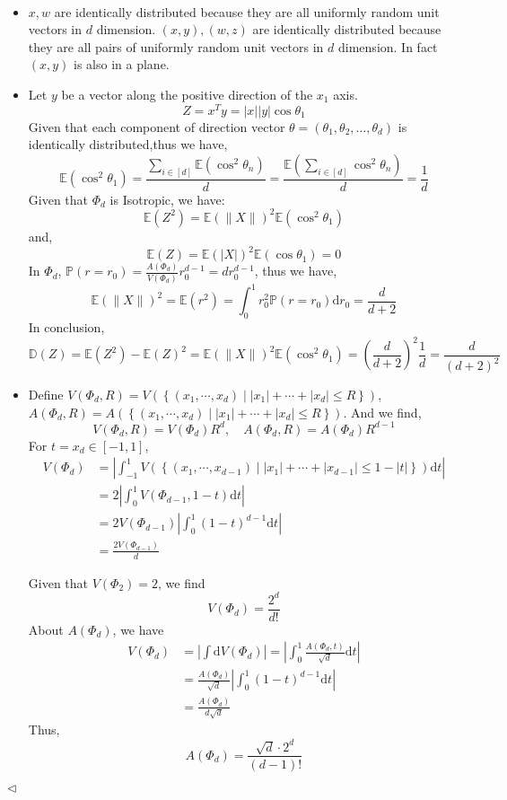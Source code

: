 \documentclass[11pt]{article}
\newenvironment{answer}[1][Answer]{\begin{trivlist}
\item[\hskip \labelsep {\bfseries #1.}\hskip \labelsep]}{\hfill$\lhd$\end{trivlist}}
\begin{document}
\begin{answer} ~
\begin{itemize}
    \item [(1)] 
$x,w$ are identically distributed because they are all uniformly random unit vectors in $d$ dimension.
$(x,y), (w,z)$ are identically distributed because they are all pairs of uniformly random unit vectors in $d$ dimension. In fact $(x,y)$ is also in a plane.
    \item [(2)] 
Let $y$ be a vector along the positive direction of the $x_1$ axis.
$$Z=x^Ty=|x||y|\cos\theta_1$$
Given that each component of direction vector $\theta=(\theta_1,\theta_2,\dots,\theta_d)$ is identically distributed,thus we have,
$$\mathbb E(\cos^2 \theta_1)=\frac{\sum_{i\in [d]}\mathbb E(\cos^2\theta_n)}{d}=\frac{\mathbb E(\sum_{i\in [d]} \cos^2\theta_n)}{d}=\frac{1}{d}$$
Given that $\Phi_d$ is Isotropic, we have:
$$\mathbb E(Z^2)=\mathbb E(\|X\|)^2\mathbb E(\cos^2\theta_1)$$
and,
$$\mathbb E(Z)=\mathbb E(|X|)^2\mathbb E(\cos\theta_1)=0$$
In $\Phi_d$, $\mathbb P(r=r_0)=\frac{A(\Phi_d)}{V(\Phi_d)}r_0^{d-1}=dr_0^{d-1}$, thus we have,
$$\mathbb E(\|X\|)^2=\mathbb E(r^2)=\int_{0}^{1}r_0^2\mathbb P(r=r_0)\mathrm dr_0=\frac{d}{d+2}$$
In conclusion,
$$\mathbb D(Z)= \mathbb E(Z^2)-\mathbb E(Z)^2=\mathbb E(\|X\|)^2\mathbb E(\cos^2\theta_1)=\left(\frac{d}{d+2}\right)^2\frac{1}{d}=\frac{d}{(d+2)^2}$$
    \item [(3)]
Define $V(\Phi_d,R)=V(\left\{(x_1,\cdots,x_d)\mid |x_1|+\cdots+|x_d|\leq R\right\})$, $A(\Phi_d,R)=A(\left\{(x_1,\cdots,x_d)\mid |x_1|+\cdots+|x_d|\leq R\right\})$. And we find,
$$V(\Phi_d,R)=V(\Phi_d)R^d,\quad A(\Phi_d,R)=A(\Phi_d)R^{d-1}$$
For $t=x_d\in [-1,1]$,
$$\begin{align*}V(\Phi_d)&=\left|\int_{-1}^{1}V(\left\{(x_1,\cdots,x_{d-1})\mid |x_1|+\cdots+|x_{d-1}|\leq 1-|t|\right\})\mathrm dt \right|\\ &= 2\left|\int_{0}^1 V(\Phi_{d-1},1-t)\mathrm dt\right|\\&=2V(\Phi_{d-1})\left|\int_{0}^{1}(1-t)^{d-1}\mathrm dt \right|\\&=\frac{2V(\Phi_{d-1})}{d}\end{align*}$$

Given that $V(\Phi_{2})=2$, we find
$$V(\Phi_d)=\frac{2^d}{d!}$$
About $A(\Phi_d)$, we have
$$\begin{align*}V(\Phi_d)&=\left|\int\mathrm dV(\Phi_d) \right|=\left|\int_{0}^{1}\frac{A(\Phi_d,t)}{\sqrt{d}}\mathrm dt \right|\\ &=\frac{A(\Phi_{d})}{\sqrt{d}}\left|\int_{0}^{1}(1-t)^{d-1}\mathrm dt \right|\\&=\frac{A(\Phi_{d})}{d\sqrt{d}}\end{align*}$$
Thus, 
$$A(\Phi_d)=\frac{\sqrt{d}\cdot 2^{d}}{(d-1)!}$$
\end{itemize}
\end{answer}
\end{document}

